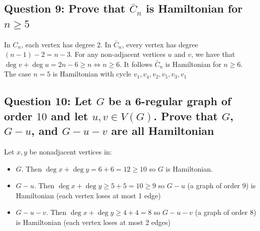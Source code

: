 \documentclass[letterpaper, 11pt]{article}
\newcommand{\1}{\mathds{1}}	%
\theoremstyle{definition}
\begin{document}
 \subsection*{Question 9: Prove that $\bar{C}_n$ is Hamiltonian for $n \ge 5$}
 In $C_n$, each vertex has degree $2$. In $\bar{C}_n$, every vertex has degree $(n-1)-2 = n-3$. For any non-adjacent vertices $u$ and $v$, we have that $\deg v + \deg u = 2n - 6 \ge n \iff n \ge 6$. It follows $\bar{C}_n$ is Hamiltonian for $n\ge 6$. The case $n=5$ is Hamiltonian with cycle $v_1, v_4, v_2, v_5, v_3, v_1$
 
 \begin{center}
\end{center}


 
\subsection*{Question 10: Let $G$ be a 6-regular graph of order $10$ and let $u,v \in V(G)$. Prove that $G$, $G-u$, and $G-u-v$ are all Hamiltonian}
Let $x,y$ be nonadjacent vertices in:
\begin{itemize}
	\item  $G$. Then $\deg x + \deg y = 6+6 = 12 \ge 10$ so $G$ is Hamiltonian. 
	\item $G - u$. Then $\deg x + \deg y \ge 5 + 5 = 10 \ge 9$ so $G - u$ (a graph of order 9) is Hamiltonian (each vertex loses at most 1 edge)
	\item $G - u - v$. Then $\deg x + \deg y \ge 4 + 4 = 8$  so $G - u - v$ (a graph of order 8) is Hamiltonian (each vertex loses at most 2 edges)
\end{itemize}
\end{document}
